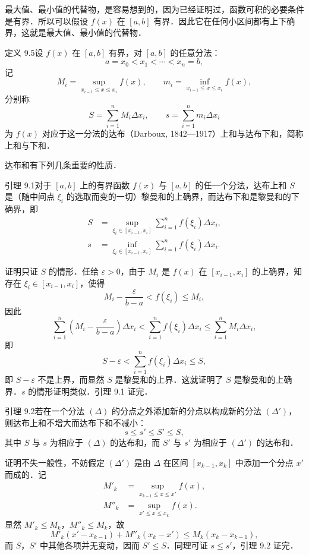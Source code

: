 最大值、最小值的代替物，是容易想到的，因为已经证明过，函数可积的必要条件是有界．所以可以假设 $f(x)$ 在 $[a, b]$ 有界．因此它在任何小区间都有上下确界，这就是最大值、最小值的代替物．

{\thmheadfont 定义 9.5}\quad 设 $f(x)$ 在 $[a, b]$ 有界，对 $[a, b]$ 的任意分法：
\[
a = x_0 < x_1 < \cdots < x_n = b,
\]
记
\[
M_i = \sup_{x_{i-1} \leqslant x \leqslant x_i} f(x), \qquad m_i = \inf_{x_{i-1} \leqslant x \leqslant x_i} f(x),
\]
分别称
\[
S = \sum_{i=1}^{n} M_i \Delta x_i, \qquad s = \sum_{i=1}^{n} m_i \Delta x_i
\]
为 $f(x)$ 对应于这一分法的达布（Darboux, 1842—1917）上和与达布下和，简称上和与下和．

达布和有下列几条重要的性质．

{\thmheadfont 引理 9.1}\quad 对于 $[a, b]$ 上的有界函数 $f(x)$ 与 $[a, b]$ 的任一个分法，达布上和 $S$ 是（随中间点 $\xi_i$ 的选取而变的一切）黎曼和的上确界，而达布下和是黎曼和的下确界，即
\[
\begin{aligned}
S &= \sup_{\xi_i \in [x_{i-1}, x_i]} \sum_{i=1}^{n} f(\xi_i) \Delta x_i, \\
s &= \inf_{\xi_i \in [x_{i-1}, x_i]} \sum_{i=1}^{n} f(\xi_i) \Delta x_i.
\end{aligned}
\]

{\thmheadfont 证明}\quad 只证 $S$ 的情形．任给 $\varepsilon > 0$，由于 $M_i$ 是 $f(x)$ 在 $[x_{i-1}, x_i]$ 的上确界，知存在 $\xi_i \in [x_{i-1}, x_i]$，使得
\[
M_i - \frac{\varepsilon}{b - a} < f(\xi_i) \leqslant M_i,
\]
因此
\[
\sum_{i=1}^{n} \left( M_i - \frac{\varepsilon}{b - a} \right) \Delta x_i < \sum_{i=1}^{n} f(\xi_i) \Delta x_i \leqslant \sum_{i=1}^{n} M_i \Delta x_i,
\]
即
\[
S - \varepsilon < \sum_{i=1}^{n} f(\xi_i) \Delta x_i \leqslant S,
\]
即 $S - \varepsilon$ 不是上界，而显然 $S$ 是黎曼和的上界．这就证明了 $S$ 是黎曼和的上确界．$s$ 的情形证明类似．引理 9.1 证完．

{\thmheadfont 引理 9.2}\quad 若在一个分法 $(\Delta)$ 的分点之外添加新的分点以构成新的分法 $(\Delta')$，则达布上和不增大而达布下和不减小：
\[
s \leqslant s' \leqslant S' \leqslant S,
\]
其中 $S$ 与 $s$ 为相应于 $(\Delta)$ 的达布和，而 $S'$ 与 $s'$ 为相应于 $(\Delta')$ 的达布和．

{\thmheadfont 证明}\quad 不失一般性，不妨假定 $(\Delta')$ 是由 $\Delta$ 在区间 $[x_{k-1}, x_k]$ 中添加一个分点 $x'$ 而成的．记
\[
\begin{aligned}
M'_k &= \sup_{x_{k-1} \leqslant x \leqslant x'} f(x), \\
M''_k &= \sup_{x' \leqslant x \leqslant x_k} f(x).
\end{aligned}
\]
显然 $M'_k \leqslant M_k$，$M''_k \leqslant M_k$，故
\[
M'_k \left( x' - x_{k-1} \right) + M''_k \left( x_k - x' \right) \leqslant M_k \left( x_k - x_{k-1} \right),
\]
而 $S$，$S'$ 中其他各项并无变动，因而 $S' \leqslant S$．同理可证 $s \leqslant s'$，引理 9.2 证完．

